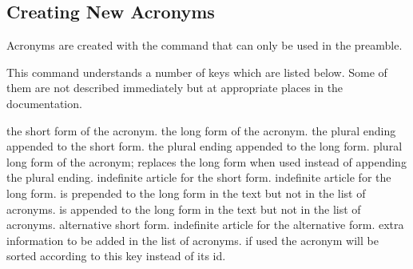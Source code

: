 \documentclass[DIV10,toc=index,toc=bib,hyperfootnotes=false]{cnpkgdoc}
\makeatletter
\providecommand*\sinceversion[1]{%
  \@bsphack
  \marginnote{%
    \footnotesize\sffamily\RaggedRight
    \textcolor{black!75}{Introduced in version~#1}}%
  \@esphack}
\providecommand*\changedversion[1]{%
  \@bsphack
  \marginnote{%
    \footnotesize\sffamily\RaggedRight
    \textcolor{black!75}{Changed in version~#1}}%
  \@esphack}
\makeatother
\begin{document}
\subsection{Creating New Acronyms}
\noindent\changedversion{1.0}Acronyms are created with the command
 that can only be used in the preamble.
\begin{beschreibung}
\end{beschreibung}
This command understands a number of keys which are listed below. Some of them
are not described immediately but at appropriate places in the documentation.
\begin{beschreibung}
 \newline
   the short form of the acronym.
 \newline
   the long form of the acronym.
   the plural ending appended to the short form.
   the plural ending appended to the long form.
 \newline
   plural long form of the acronym; replaces the long form when used instead of
   appending the plural ending.
   \sinceversion{1.2}%
   indefinite article for the short form.
   \sinceversion{1.2}%
   indefinite article for the long form.
 \newline
   \sinceversion{1.1} is prepended to the long form in the text but
   not in the list of acronyms.
 \newline
   \sinceversion{1.1} is appended to the long form in the text but
   not in the list of acronyms.
 \newline
   alternative short form.
   \sinceversion{1.2}%
   indefinite article for the alternative form.
 \newline
   extra information to be added in the list of acronyms.
 \newline
   if used the acronym will be sorted according to this key instead of its \acs{id}.

\end{beschreibung}
\end{document}
